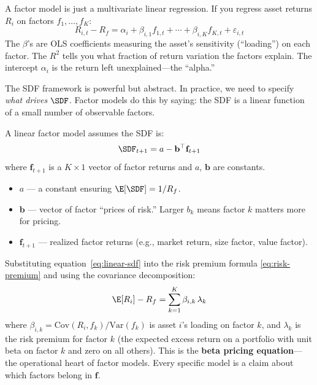 \begin{prereq}
A factor model is just a multivariate linear regression. If you regress asset returns $R_i$ on factors $f_1, \ldots, f_K$:
\[
R_{i,t} - R_f = \alpha_i + \beta_{i,1} f_{1,t} + \cdots + \beta_{i,K} f_{K,t} + \varepsilon_{i,t}
\]
The $\beta$'s are OLS coefficients measuring the asset's sensitivity (``loading'') on each factor. The $R^2$ tells you what fraction of return variation the factors explain. The intercept $\alpha_i$ is the return left unexplained---the ``alpha.''
\end{prereq}

The SDF framework is powerful but abstract. In practice, we need to specify \emph{what drives $\SDF$}. Factor models do this by saying: the SDF is a linear function of a small number of observable factors.

\begin{definition}
A linear factor model assumes the SDF is:
\begin{equation}
\SDF_{t+1} = a - \mathbf{b}^\top \mathbf{f}_{t+1}
\label{eq:linear-sdf}
\end{equation}
where $\mathbf{f}_{t+1}$ is a $K \times 1$ vector of factor returns and $a$, $\mathbf{b}$ are constants.
\begin{itemize}[nosep]
  \item $a$ --- a constant ensuring $\E[\SDF] = 1/R_f$.
  \item $\mathbf{b}$ --- vector of factor ``prices of risk.'' Larger $b_k$ means factor $k$ matters more for pricing.
  \item $\mathbf{f}_{t+1}$ --- realized factor returns (e.g., market return, size factor, value factor).
\end{itemize}
\end{definition}

Substituting equation~\eqref{eq:linear-sdf} into the risk premium formula \eqref{eq:risk-premium} and using the covariance decomposition:
\begin{equation}
\E[R_i] - R_f = \sum_{k=1}^{K} \beta_{i,k} \, \lambda_k
\label{eq:beta-pricing}
\end{equation}
where $\beta_{i,k} = \text{Cov}(R_i, f_k) / \text{Var}(f_k)$ is asset $i$'s loading on factor $k$, and $\lambda_k$ is the risk premium for factor $k$ (the expected excess return on a portfolio with unit beta on factor $k$ and zero on all others). This is the \textbf{beta pricing equation}---the operational heart of factor models. Every specific model is a claim about which factors belong in $\mathbf{f}$.

